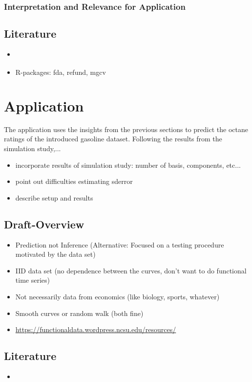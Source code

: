 \documentclass[11pt,twoside,a4paper]{article}
\begin{document}
\subsubsection{Interpretation and Relevance for Application}


	\subsection{Literature}
	\begin{itemize}
		\item \cite{shonkwiler_explorations_2009}
		\item R-packages: fda, refund, mgcv
	\end{itemize}
	
	\newpage
	\section{Application}
The application uses the insights from the previous sections to predict the octane ratings of the introduced gasoline dataset. Following the results from the simulation study,... 
\begin{itemize}
\item
{\color{green} incorporate results of simulation study: number of basis, components, etc...}
\item
point out difficulties estimating sderror
\item
describe setup and results
\end{itemize}


	\subsection{Draft-Overview}
	\begin{itemize}
		\item Prediction not Inference (Alternative: Focused on a testing procedure motivated by the data set)
		\item IID data set (no dependence between the curves, don't want to do functional time series)
		\item Not necessarily data from economics (like biology, sports, whatever)
		\item Smooth curves or random walk (both fine)
		\item \href{https://functionaldata.wordpress.ncsu.edu/resources/}{https://functionaldata.wordpress.ncsu.edu/resources/}
	\end{itemize}
	
	\subsection{Literature}
	\begin{itemize}
		\item \cite{carey_life_2002}
	\end{itemize}
\end{document}
